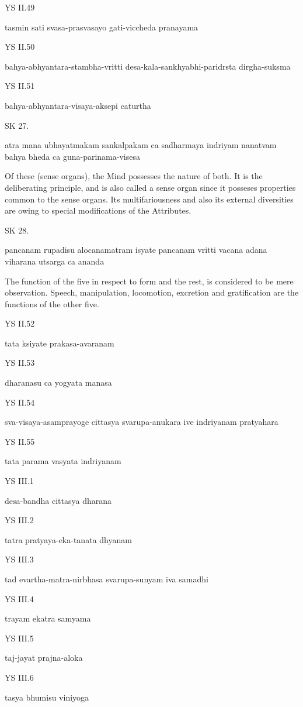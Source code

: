 YS II.49

tasmin sati svasa-prasvasayo gati-viccheda pranayama

YS II.50

bahya-abhyantara-stambha-vritti desa-kala-sankhyabhi-paridrsta dirgha-suksma

YS II.51

bahya-abhyantara-visaya-aksepi caturtha

SK 27.

atra mana ubhayatmakam sankalpakam ca sadharmaya indriyam
nanatvam bahya bheda ca guna-parinama-visesa

Of these (sense organs), the Mind possesses the nature of both.
It is the deliberating principle, and is also called a sense organ
since it posseses properties common to the sense organs.
Its multifariousness and also its external diversities are owing
to special modifications of the Attributes.

SK 28.

pancanam rupadisu alocanamatram isyate
pancanam vritti vacana adana viharana utsarga ca ananda

The function of the five in respect to form and the rest,
is considered to be mere observation.
Speech, manipulation, locomotion, excretion and gratification
are the functions of the other five.

YS II.52

tata ksiyate prakasa-avaranam

YS II.53

dharanasu ca yogyata manasa

YS II.54

sva-visaya-asamprayoge cittasya svarupa-anukara ive indriyanam pratyahara

YS II.55

tata parama vasyata indriyanam

YS III.1

desa-bandha cittasya dharana

YS III.2

tatra pratyaya-eka-tanata dhyanam

YS III.3

tad evartha-matra-nirbhasa svarupa-sunyam iva samadhi

YS III.4

trayam ekatra samyama

YS III.5

taj-jayat prajna-aloka

YS III.6

tasya bhumisu viniyoga

